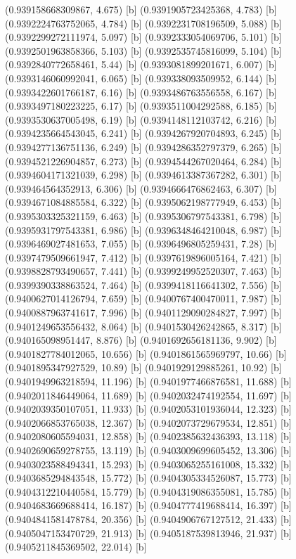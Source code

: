 {{{(0.939158668309867, 4.675) [b] 
(0.9391905723425368, 4.783) [b] 
(0.9392224763752065, 4.784) [b] 
(0.9392231708196509, 5.088) [b] 
(0.9392299272111974, 5.097) [b] 
(0.9392333054069706, 5.101) [b] 
(0.9392501963858366, 5.103) [b] 
(0.9392535745816099, 5.104) [b] 
(0.9392840772658461, 5.44) [b] 
(0.9393081899201671, 6.007) [b] 
(0.9393146060992041, 6.065) [b] 
(0.939338093509952, 6.144) [b] 
(0.9393422601766187, 6.16) [b] 
(0.9393486763556558, 6.167) [b] 
(0.9393497180223225, 6.17) [b] 
(0.9393511004292588, 6.185) [b] 
(0.9393530637005498, 6.19) [b] 
(0.9394148112103742, 6.216) [b] 
(0.9394235664543045, 6.241) [b] 
(0.9394267920704893, 6.245) [b] 
(0.9394277136751136, 6.249) [b] 
(0.9394286352797379, 6.265) [b] 
(0.9394521226904857, 6.273) [b] 
(0.9394544267020464, 6.284) [b] 
(0.9394604171321039, 6.298) [b] 
(0.9394613387367282, 6.301) [b] 
(0.939464564352913, 6.306) [b] 
(0.9394666476862463, 6.307) [b] 
(0.9394671084885584, 6.322) [b] 
(0.9395062198777949, 6.453) [b] 
(0.9395303325321159, 6.463) [b] 
(0.9395306797543381, 6.798) [b] 
(0.9395931797543381, 6.986) [b] 
(0.9396348464210048, 6.987) [b] 
(0.9396469027481653, 7.055) [b] 
(0.9396496805259431, 7.28) [b] 
(0.9397479509661947, 7.412) [b] 
(0.9397619896005164, 7.421) [b] 
(0.9398828793490657, 7.441) [b] 
(0.9399249952520307, 7.463) [b] 
(0.9399390338863524, 7.464) [b] 
(0.9399418116641302, 7.556) [b] 
(0.9400627014126794, 7.659) [b] 
(0.9400767400470011, 7.987) [b] 
(0.9400887963741617, 7.996) [b] 
(0.9401129090284827, 7.997) [b] 
(0.9401249653556432, 8.064) [b] 
(0.9401530426242865, 8.317) [b] 
(0.940165098951447, 8.876) [b] 
(0.9401692656181136, 9.902) [b] 
(0.9401827784012065, 10.656) [b] 
(0.9401861565969797, 10.66) [b] 
(0.9401895347927529, 10.89) [b] 
(0.9401929129885261, 10.92) [b] 
(0.9401949963218594, 11.196) [b] 
(0.9401977466876581, 11.688) [b] 
(0.9402011846449064, 11.689) [b] 
(0.9402032474192554, 11.697) [b] 
(0.9402039350107051, 11.933) [b] 
(0.9402053101936044, 12.323) [b] 
(0.9402066853765038, 12.367) [b] 
(0.9402073729679534, 12.851) [b] 
(0.9402080605594031, 12.858) [b] 
(0.9402385632436393, 13.118) [b] 
(0.9402690659278755, 13.119) [b] 
(0.9403009699605452, 13.306) [b] 
(0.9403023588494341, 15.293) [b] 
(0.9403065255161008, 15.332) [b] 
(0.9403685294843548, 15.772) [b] 
(0.9404305334526087, 15.773) [b] 
(0.9404312210440584, 15.779) [b] 
(0.9404319086355081, 15.785) [b] 
(0.9404683669688414, 16.187) [b] 
(0.9404777419688414, 16.397) [b] 
(0.9404841581478784, 20.356) [b] 
(0.9404906767127512, 21.433) [b] 
(0.9405047153470729, 21.913) [b] 
(0.9405187539813946, 21.937) [b] 
(0.9405211845369502, 22.014) [b] 
}}}
